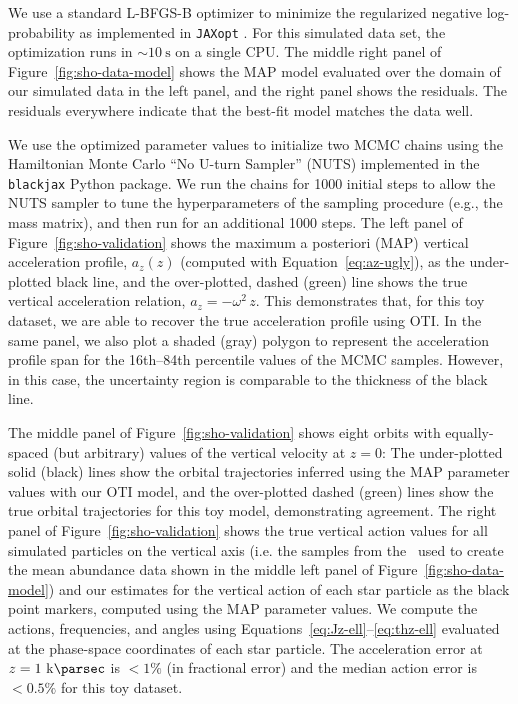 \documentclass[modern]{aastex631}
\begin{document}
We use a standard L-BFGS-B optimizer \citep{Byrd:1995} to minimize the regularized
negative log-probability as implemented in \texttt{JAXopt} \citep{jaxopt:2021}.
For this simulated data set, the optimization runs in $\sim 10~\unit{\second}$ on a
single CPU.
The middle right panel of Figure~\ref{fig:sho-data-model} shows the MAP model evaluated
over the domain of our simulated data in the left panel, and the right panel shows the
residuals.
The residuals everywhere indicate that the best-fit model matches the data well.

We use the optimized parameter values to initialize two MCMC chains using the
Hamiltonian Monte Carlo ``No U-turn Sampler'' (NUTS) implemented in the
\texttt{blackjax} \citep{blackjax2020github} Python package.
We run the chains for 1000 initial steps to allow the NUTS sampler to tune the
hyperparameters of the sampling procedure (e.g., the mass matrix), and then run for an
additional 1000 steps.
The left panel of Figure~\ref{fig:sho-validation} shows the maximum a posteriori (MAP)
vertical acceleration profile, $a_z(z)$ (computed with Equation~\ref{eq:az-ugly}), as
the under-plotted black line, and the over-plotted, dashed (green) line shows the true
vertical acceleration relation, $a_z = -\omega^2 \, z$.
This demonstrates that, for this toy dataset, we are able to recover the true
acceleration profile using OTI.
In the same panel, we also plot a shaded (gray) polygon to represent the acceleration
profile span for the 16th--84th percentile values of the MCMC samples.
However, in this case, the uncertainty region is comparable to the thickness of the
black line.

The middle panel of Figure~\ref{fig:sho-validation} shows eight orbits with
equally-spaced (but arbitrary) values of the vertical velocity at $z=0$: The
under-plotted solid (black) lines show the orbital trajectories inferred using the MAP
parameter values with our OTI model, and the over-plotted dashed (green) lines show the
true orbital trajectories for this toy model, demonstrating agreement.
The right panel of Figure~\ref{fig:sho-validation} shows the true vertical action values
for all simulated particles on the vertical axis (i.e. the samples from the \df\ used to
create the mean abundance data shown in the middle left panel of
Figure~\ref{fig:sho-data-model}) and our estimates for the vertical action of each star
particle as the black point markers, computed using the MAP parameter values.
We compute the actions, frequencies, and angles using
Equations~\ref{eq:Jz-ell}--\ref{eq:thz-ell} evaluated at the phase-space coordinates of
each star particle.
The acceleration error at $z=1~\kpc$ is $< 1\%$ (in fractional error) and the median
action error is $<0.5\%$ for this toy dataset.
\end{document}
